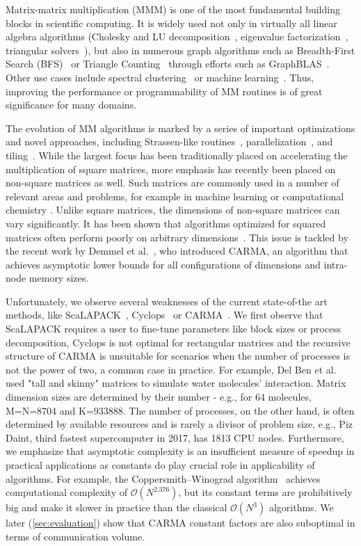\documentclass[sigplan,review,anonymous]{acmart}\settopmatter{printfolios=true,printccs=false,printacmref=false}
\begin{document}
Matrix-matrix multiplication (MMM) is one of the most fundamental building 
blocks in
scientific computing. It is widely used not only in virtually all linear
algebra algorithms (Cholesky and LU decomposition~\cite{meyer2000matrix},
eigenvalue factorization~\cite{chatelin2012eigenvalues}, triangular
solvers~\cite{linearAlgebraLAPACK}), but also in numerous graph algorithms such
as Breadth-First Search (BFS)~\cite{cormen2009introduction} or Triangle
Counting~\cite{azad2015parallel} through efforts such as
GraphBLAS~\cite{kepner2016mathematical}.  Other use cases include spectral
clustering~\cite{ng2002spectral} or machine
learning~\cite{abadi2016tensorflow}.  Thus, improving the performance or
programmability of MM routines is of great significance for many domains.

%
The evolution of MM algorithms is marked by a series of important optimizations
and novel approaches, including Strassen-like routines~\cite{Strassen}, 
parallelization~\cite{parallelMMM},
and tiling~\cite{tiling}.
%
While the largest focus has been traditionally placed on accelerating the
multiplication of square matrices, more emphasis has recently been placed on
non-square matrices as well. Such matrices are commonly used in a number of
relevant areas and problems, for example in machine learning
\cite{rectangularML} or computational chemistry \cite{rectangularChemistry}.
%
Unlike square matrices, the dimensions of non-square matrices can vary
significantly.
It has been shown that algorithms optimized for squared matrices often perform 
poorly on arbitrary dimensions~\cite{CARMA}.
%
This issue is tackled by the recent work by Demmel et al.~\cite{CARMA}, who
introduced CARMA, an algorithm that achieves asymptotic lower bounds for all 
configurations of dimensions and intra-node memory sizes.

Unfortunately, we observe several weaknesses of the current state-of-the art 
methods, like ScaLAPACK~\cite{scalapack}, Cyclops~\cite{cyclops} or 
CARMA~\cite{CARMA}. We first observe that ScaLAPACK 
requires a user to fine-tune 
parameters 
like block sizes or process decomposition, Cyclops is not optimal for 
rectangular matrices and the recursive 
structure of CARMA is
unsuitable for scenarios when the number of processes is not the power of two,
a common case in practice. For example, Del Ben et al.~\cite{joost} used "tall 
and skinny" matrices to simulate water molecules' interaction. Matrix dimension 
sizes are 
determined by their number - e.g., for 64 molecules, M=N=8704 and K=933888. 
The number of processes, on the other hand, is often determined by available 
resources and is 
rarely a divisor of problem size, e.g., Piz Daint, third fastest supercomputer 
in 2017, has 1813 CPU nodes. 
Furthermore, we emphasize that asymptotic complexity is an
insufficient measure of speedup in practical applications as constants do play
crucial role in applicability of algorithms. For example, the
Coppersmith--Winograd algorithm~\cite{coppersmith} achieves computational
complexity of $\mathcal{O}(N^{2.376})$, but its constant terms are 
prohibitively big and
make it slower in practice than the classical $\mathcal{O}(N^{3})$ algorithms. 
We later (\cref{sec:evaluation}) show that CARMA constant factors are also 
suboptimal in terms of communication volume.
\end{document}

